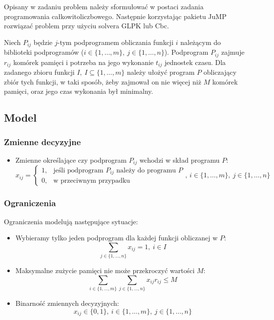 \documentclass{article}
\begin{document}
    Opisany w zadaniu problem należy sformułować w postaci zadania programowania całkowitoliczbowego. Następnie korzystając pakietu JuMP 
    rozwiązać problem przy użyciu solvera GLPK lub Cbc.

    Niech $P_{ij}$ będzie $j$-tym podprogramem obliczania funkcji $i$ należącym do biblioteki podprogramów 
    ($i \in \{1,\dots ,m\},\ j \in \{1,\dots,n\}$).
    Podprogram $P_{ij}$ zajmuje $r_{ij}$ komórek pamięci i potrzeba na jego wykonanie $t_{ij}$ jednostek czasu.
    Dla zadanego zbioru funkcji $I, \ I \subseteq \{1, \dots, m\}$ należy ułożyć program $P$ obliczający zbiór tych funkcji, w taki sposób, 
    żeby zajmował on nie więcej niż $M$ komórek pamięci, oraz jego czas wykonania był minimalny.

    \subsection{Model}
    
      
    \subsubsection{Zmienne decyzyjne}

    \begin{itemize}
        \item Zmienne określające czy podprogram $P_{ij}$ wchodzi w skład programu $P$:
        \begin{equation*}
            x_{ij} =
            \begin{cases}
                1, & \text{jeśli podprogram $P_{ij}$ należy do programu $P$} \\
                0, & \text{w przeciwnym przypadku}
            \end{cases}
            \text{, $i \in \{1,\dots, m\},\ j \in \{1,\dots, n\}$}
        \end{equation*}  
    \end{itemize}


    \subsubsection{Ograniczenia}

    Ograniczenia modelują następujące sytuacje:
    \begin{itemize}
        \item Wybieramy tylko jeden podprogram dla każdej funkcji obliczanej w $P$:
            $$\sum_{j \in \{1, \dots, n\}} x_{ij} = 1, \ i \in I$$
        
        \item Maksymalne zużycie pamięci nie może przekroczyć wartości $M$:
            $$\sum_{i \in \{1, \dots, m\}} \sum_{j \in \{1, \dots, n\}} x_{ij} r_{ij} \leq M$$

        \item Binarność zmiennych decyzyjnych:
            $$x_{ij} \in \{0, 1\},\ i \in \{1,\dots, m\},\ j \in \{1,\dots, n\}$$
    \end{itemize}
    
\end{document}
